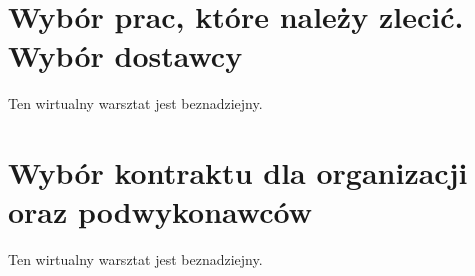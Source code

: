 \section{Wybór prac, które należy zlecić. Wybór dostawcy}

Ten wirtualny warsztat jest beznadziejny.


\section{Wybór kontraktu dla organizacji oraz podwykonawców}

Ten wirtualny warsztat jest beznadziejny.
